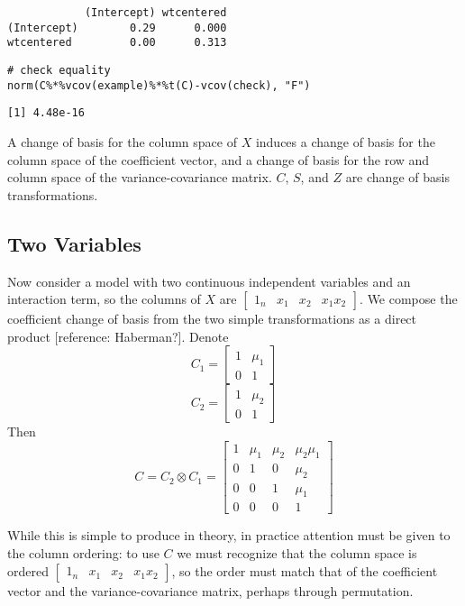 \documentclass[]{article}
\begin{document}
\begin{verbatim}
            (Intercept) wtcentered
(Intercept)        0.29      0.000
wtcentered         0.00      0.313
\end{verbatim}

\begin{verbatim}
# check equality
norm(C%*%vcov(example)%*%t(C)-vcov(check), "F")
\end{verbatim}

\begin{verbatim}
[1] 4.48e-16
\end{verbatim}

A change of basis for the column space of \(X\) induces a change of
basis for the column space of the coefficient vector, and a change of
basis for the row and column space of the variance-covariance matrix.
\(C\), \(S\), and \(Z\) are change of basis transformations.

\hypertarget{two-variables}{%
\subsection{Two Variables}\label{two-variables}}

Now consider a model with two continuous independent variables and an
interaction term, so the columns of \(X\) are
\(\begin{bmatrix} 1_n &x_1 &x_2 &x_1x_2 \end{bmatrix}\). We compose the
coefficient change of basis from the two simple transformations as a
direct product {[}reference: Haberman?{]}. Denote
\[C_1=\begin{bmatrix}1 & \mu_1 \\ 0 & 1 \end{bmatrix}\]
\[C_2=\begin{bmatrix}1 & \mu_2 \\ 0 & 1 \end{bmatrix}\] Then
\[C = C_2 \otimes C_1 = \begin{bmatrix} 1 & \mu_1 &\mu_2 &\mu_2\mu_1 \\
  0 &1 &0 &\mu_2 \\ 0 &0 &1 &\mu_1 \\ 0 &0 &0 &1 \end{bmatrix}\]

While this is simple to produce in theory, in practice attention must be
given to the column ordering: to use \(C\) we must recognize that the
column space is ordered
\(\begin{bmatrix} 1_n &x_1 &x_2 &x_1x_2 \end{bmatrix}\), so the order
must match that of the coefficient vector and the variance-covariance
matrix, perhaps through permutation.
\end{document}
